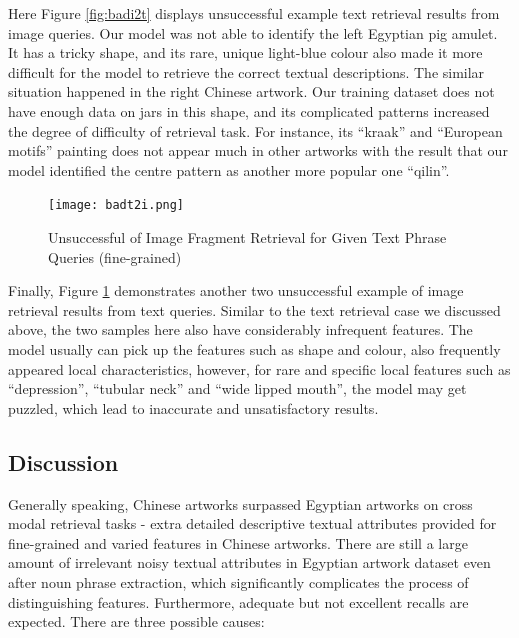 Here Figure \ref{fig:badi2t} displays unsuccessful example text retrieval results from image queries. Our model was not able to identify the left Egyptian pig amulet. It has a tricky shape, and its rare, unique light-blue colour also made it more difficult for the model to retrieve the correct textual descriptions. The similar situation happened in the right Chinese artwork. Our training dataset does not have enough data on jars in this shape, and its complicated patterns increased the degree of difficulty of retrieval task. For instance, its ``kraak'' and ``European motifs'' painting does not appear much in other artworks with the result that our model identified the centre pattern as another more popular one ``qilin''.

\begin{figure}[h!]
\centering
\texttt{[image: badt2i.png]}
\caption{Unsuccessful of Image Fragment Retrieval for Given Text Phrase Queries (fine-grained)}
\label{fig:badt2i}
\end{figure}

Finally, Figure \ref{fig:badt2i} demonstrates another two unsuccessful example of image retrieval results from text queries. Similar to the text retrieval case we discussed above, the two samples here also have considerably infrequent features. The model usually can pick up the features such as shape and colour, also frequently appeared local characteristics, however, for rare and specific local features such as ``depression'', ``tubular neck'' and ``wide lipped mouth'', the model may get puzzled, which lead to inaccurate and unsatisfactory results.

\subsection{Discussion}
Generally speaking, Chinese artworks surpassed Egyptian artworks on cross modal retrieval tasks - extra detailed descriptive textual attributes provided for fine-grained and varied features in Chinese artworks. There are still a large amount of irrelevant noisy textual attributes in Egyptian artwork dataset even after noun phrase extraction, which significantly complicates the process of distinguishing features. Furthermore, adequate but not excellent recalls are expected. There are three possible causes:

